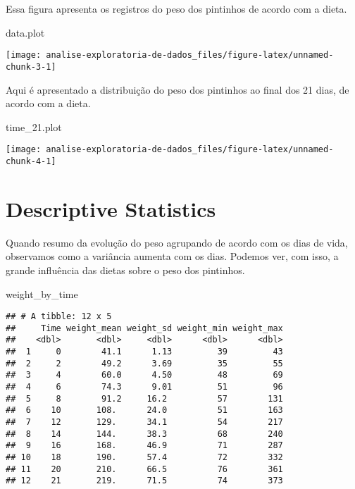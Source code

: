\documentclass[]{article}
\newenvironment{Shaded}{\begin{snugshade}}{\end{snugshade}}
\newcommand{\FloatTok}[1]{\textcolor[rgb]{0.00,0.00,0.81}{#1}}
\newcommand{\NormalTok}[1]{#1}
\begin{document}
Essa figura apresenta os registros do peso dos pintinhos de acordo com a
dieta.

\begin{Shaded}
\begin{Highlighting}[]
\NormalTok{data.plot}
\end{Highlighting}
\end{Shaded}

\begin{center}\texttt{[image: analise-exploratoria-de-dados\_files/figure-latex/unnamed-chunk-3-1]} \end{center}

Aqui é apresentado a distribuição do peso dos pintinhos ao final dos 21
dias, de acordo com a dieta.

\begin{Shaded}
\begin{Highlighting}[]
\NormalTok{time_}\FloatTok{21.}\NormalTok{plot}
\end{Highlighting}
\end{Shaded}

\begin{center}\texttt{[image: analise-exploratoria-de-dados\_files/figure-latex/unnamed-chunk-4-1]} \end{center}

\section{Descriptive Statistics}\label{descriptive-statistics}

Quando resumo da evolução do peso agrupando de acordo com os dias de
vida, observamos como a variância aumenta com os dias. Podemos ver, com
isso, a grande influência das dietas sobre o peso dos pintinhos.

\begin{Shaded}
\begin{Highlighting}[]
\NormalTok{weight_by_time}
\end{Highlighting}
\end{Shaded}

\begin{verbatim}
## # A tibble: 12 x 5
##     Time weight_mean weight_sd weight_min weight_max
##    <dbl>       <dbl>     <dbl>      <dbl>      <dbl>
##  1     0        41.1      1.13         39         43
##  2     2        49.2      3.69         35         55
##  3     4        60.0      4.50         48         69
##  4     6        74.3      9.01         51         96
##  5     8        91.2     16.2          57        131
##  6    10       108.      24.0          51        163
##  7    12       129.      34.1          54        217
##  8    14       144.      38.3          68        240
##  9    16       168.      46.9          71        287
## 10    18       190.      57.4          72        332
## 11    20       210.      66.5          76        361
## 12    21       219.      71.5          74        373
\end{verbatim}
\end{document}
